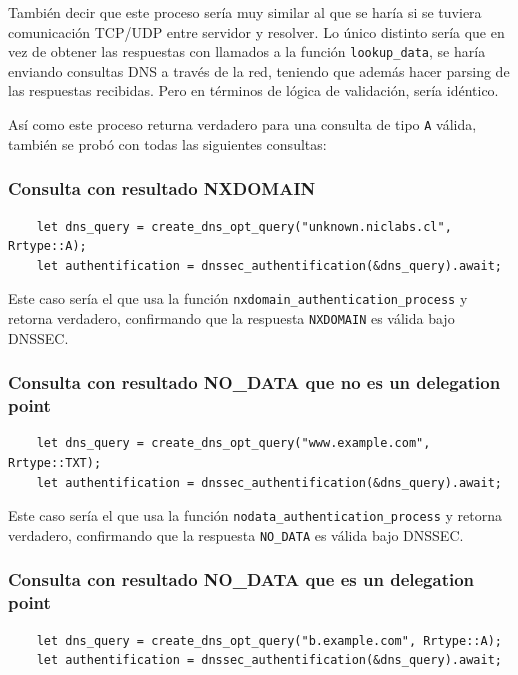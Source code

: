 También decir que este proceso sería muy similar al que se haría si se tuviera comunicación TCP/UDP entre servidor y resolver. Lo único distinto sería que en vez de obtener
las respuestas con llamados a la función \texttt{lookup\_data}, se haría enviando consultas DNS a través de la red, teniendo que además hacer parsing de las respuestas recibidas.
Pero en términos de lógica de validación, sería idéntico.

Así como este proceso returna verdadero para una consulta de tipo \texttt{A} válida, también se probó con todas las siguientes consultas:

\subsubsection{Consulta con resultado NXDOMAIN}

\begin{lstlisting}
    let dns_query = create_dns_opt_query("unknown.niclabs.cl", Rrtype::A);
    let authentification = dnssec_authentification(&dns_query).await;
\end{lstlisting}

Este caso sería el que usa la función \texttt{nxdomain\_authentication\_process} y retorna verdadero, confirmando que la respuesta \texttt{NXDOMAIN} es válida bajo DNSSEC.

\subsubsection{Consulta con resultado NO\_DATA que no es un delegation point}

\begin{lstlisting}
    let dns_query = create_dns_opt_query("www.example.com", Rrtype::TXT);
    let authentification = dnssec_authentification(&dns_query).await;
\end{lstlisting}

Este caso sería el que usa la función \texttt{nodata\_authentication\_process} y retorna verdadero, confirmando que la respuesta \texttt{NO\_DATA} es válida bajo DNSSEC.

\subsubsection{Consulta con resultado NO\_DATA que es un delegation point}

\begin{lstlisting}
    let dns_query = create_dns_opt_query("b.example.com", Rrtype::A);
    let authentification = dnssec_authentification(&dns_query).await;
\end{lstlisting}

